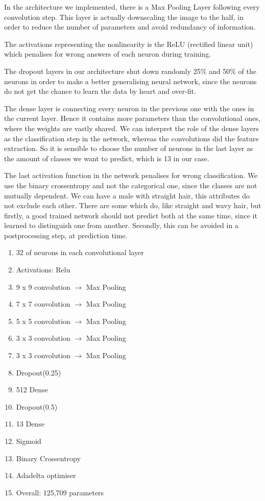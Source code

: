 \documentclass[12.5pt]{scrartcl}
\begin{document}
	In the architecture we implemented, there is a Max Pooling Layer following every convolution step. This layer is actually downscaling the image to the half, in order to reduce the number of parameters and avoid redundancy of information.
	
	The activations representing the nonlinearity is the ReLU (rectified linear unit) which penalises for wrong answers of each neuron during training.
	
	The dropout layers in our architecture shut down randomly 25\% and 50\% of the neurons in order to make a better generalising neural network, since the neurons do not get the chance to learn the data by heart and over-fit.
	
	The dense layer is connecting every neuron in the previous one with the ones in the current layer. Hence it contains more parameters than the convolutional ones, where the weights are vastly shared. We can interpret the role of the dense layers as the classification step in the network, whereas the convolutions did the feature extraction. So it is sensible to choose the number of neurons in the last layer as the amount of classes we want to predict, which is 13 in our case.
	
	The last activation function in the network penalises for wrong classification. We use the binary crossentropy and not the categorical one, since the classes are not mutually dependent. We can have a male with straight hair, this attributes do not exclude each other. There are some which do, like straight and wavy hair, but firstly, a good trained network should not predict both at the same time, since it learned to distinguish one from another. Secondly, this can be avoided in a postprocessing step, at prediction time.
	
	\begin{enumerate}
		\item 	32 of neurons in each convolutional layer
		\item Activations: Relu
		\item 9 x 9 convolution $\rightarrow$ Max Pooling
		\item	7 x 7 convolution $\rightarrow$  Max Pooling
		\item	5 x 5 convolution $\rightarrow$  Max Pooling
		\item	3 x 3 convolution $\rightarrow$  Max Pooling
		\item	3 x 3 convolution $\rightarrow$  Max Pooling
		\item	Dropout(0.25)
		\item	512 Dense
		\item	Dropout(0.5)
		\item	13 Dense
		\item	Sigmoid
		\item	Binary Crossentropy
		\item	Adadelta optimiser
		\item Overall: 125,709 parameters
	\end{enumerate}
\end{document}

